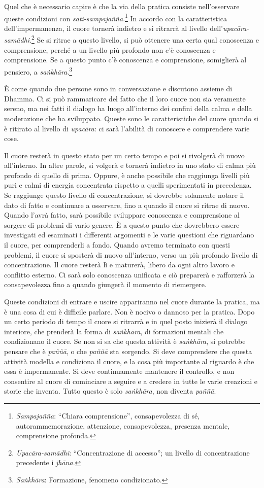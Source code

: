 Quel che è necessario capire è che la via della pratica consiste
nell'osservare queste condizioni con \emph{sati-sampajañña}.\footnote{\emph{Sampajañña}:
  ``Chiara comprensione'', consapevolezza di sé, autorammemorazione,
  attenzione, consapevolezza, presenza mentale, comprensione profonda.}
In accordo con la caratteristica dell'impermanenza, il cuore tornerà
indietro e si ritrarrà al livello dell'\emph{upacāra-samādhi}.\footnote{\emph{Upacāra-samādhi}:
  ``Concentrazione di accesso''; un livello di concentrazione precedente
  i \emph{jhāna}.} Se si ritrae a questo livello, si può ottenere una
certa qual conoscenza e comprensione, perché a un livello più profondo
non c'è conoscenza e comprensione. Se a questo punto c'è conoscenza e
comprensione, somiglierà al pensiero, a \emph{saṅkhāra}.\footnote{\emph{Saṅkhāra}:
  Formazione, fenomeno condizionato.}

È come quando due persone sono in conversazione e discutono assieme di
Dhamma. Ci si può rammaricare del fatto che il loro cuore non sia
veramente sereno, ma nei fatti il dialogo ha luogo all'interno dei
confini della calma e della moderazione che ha sviluppato. Queste sono
le caratteristiche del cuore quando si è ritirato al livello di
\emph{upacāra}: ci sarà l'abilità di conoscere e comprendere varie cose.

Il cuore resterà in questo stato per un certo tempo e poi si rivolgerà
di nuovo all'interno. In altre parole, si volgerà e tornerà indietro in
uno stato di calma più profondo di quello di prima. Oppure, è anche
possibile che raggiunga livelli più puri e calmi di energia concentrata
rispetto a quelli sperimentati in precedenza. Se raggiunge questo
livello di concentrazione, si dovrebbe solamente notare il dato di fatto
e continuare a osservare, fino a quando il cuore si ritrae di nuovo.
Quando l'avrà fatto, sarà possibile sviluppare conoscenza e comprensione
al sorgere di problemi di vario genere. È a questo punto che dovrebbero
essere investigati ed esaminati i differenti argomenti e le varie
questioni che riguardano il cuore, per comprenderli a fondo. Quando
avremo terminato con questi problemi, il cuore si sposterà di nuovo
all'interno, verso un più profondo livello di concentrazione. Il cuore
resterà lì e maturerà, libero da ogni altro lavoro e conflitto esterno.
Ci sarà solo conoscenza unificata e ciò preparerà e rafforzerà la
consapevolezza fino a quando giungerà il momento di riemergere.

Queste condizioni di entrare e uscire appariranno nel cuore durante la
pratica, ma è una cosa di cui è difficile parlare. Non è nocivo o
dannoso per la pratica. Dopo un certo periodo di tempo il cuore si
ritrarrà e in quel posto inizierà il dialogo interiore, che prenderà la
forma di \emph{saṅkhāra}, di formazioni mentali che condizionano il
cuore. Se non si sa che questa attività è \emph{saṅkhāra}, si potrebbe
pensare che è \emph{paññā}, o che \emph{paññā} sta sorgendo. Si deve
comprendere che questa attività modella e condiziona il cuore, e la cosa
più importante al riguardo è che essa è impermanente. Si deve
continuamente mantenere il controllo, e non consentire al cuore di
cominciare a seguire e a credere in tutte le varie creazioni e storie
che inventa. Tutto questo è solo \emph{saṅkhāra}, non diventa
\emph{paññā}.

